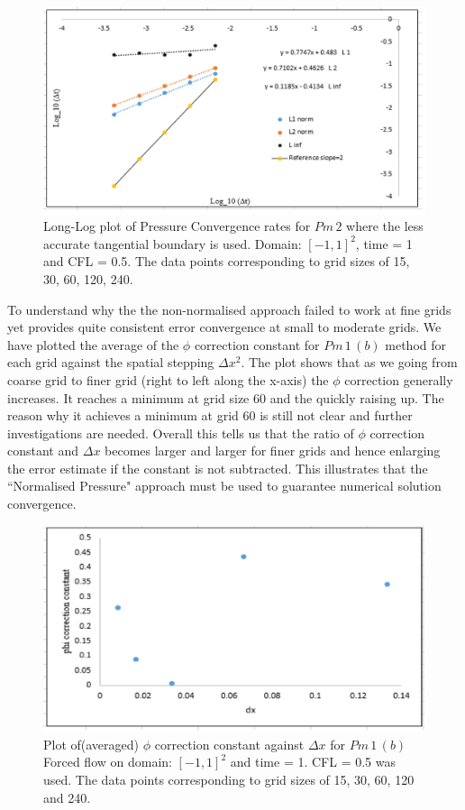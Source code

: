 \begin{figure}[H]
	\centering
	\includegraphics[width=4.5in]{figures/Pm2_pf2_cN_np_Dbc_P_error_t_1_grid_120.jpg}
	\caption{Long-Log plot of Pressure Convergence rates for $Pm\,2$ where the less accurate tangential boundary is used. Domain: $[-1,1]^2$, time = 1 and CFL = 0.5. The data points corresponding to grid sizes of 15, 30, 60, 120, 240.}\label{fig:6.16}
\end{figure}

\newpage
To understand why the the non-normalised approach failed to work at fine grids yet provides quite consistent error convergence at small to moderate grids. We have plotted the average of the $\phi$ correction constant for $Pm\,1\,(b)$ method for each grid against the spatial stepping $\Delta x^2$. The plot shows that as we going from coarse grid to finer grid (right to left along the x-axis) the $\phi$ correction generally increases. It reaches a minimum at grid size 60 and the quickly raising up. The reason why it achieves a minimum at grid 60 is still not clear and further investigations are needed. Overall this tells us that the ratio of $\phi$ correction constant and $\Delta x$ becomes larger and larger for finer grids and hence enlarging the error estimate if the constant is not subtracted. This illustrates that the ``Normalised Pressure" approach must be used to guarantee numerical solution convergence. \\

\begin{figure}[H]
	\centering
	\includegraphics[width=4.5in]{figures/Pm1b_pf2_np_phi_c.jpg}
	\caption{Plot of(averaged) $\phi$ correction constant against $\Delta x$ for $Pm\,1\,(b)$ Forced flow on domain: $[-1,1]^2$ and time = 1. CFL = 0.5 was used. The data points corresponding to grid sizes of 15, 30, 60, 120 and 240.}\label{fig:6.16}
\end{figure}

